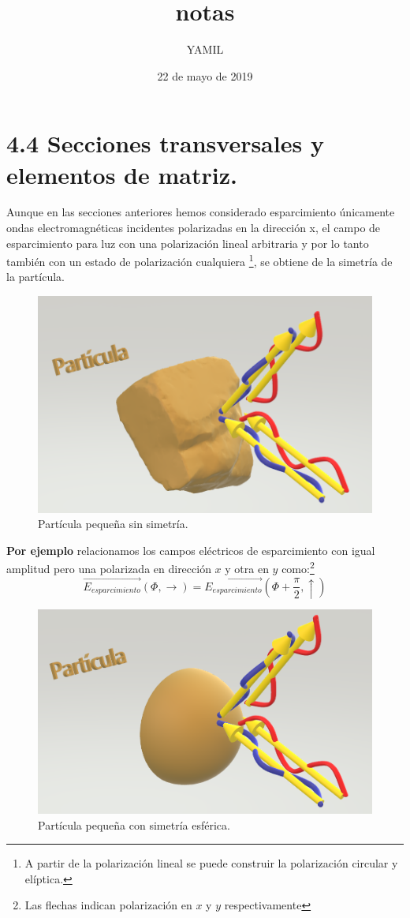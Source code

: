 \documentclass[letterpaper, 11pt]{article}
\title{notas} %
\author{YAMIL} %
\date{\small 22 de mayo de 2019}
\begin{document}
\maketitle %

\section*{4.4 Secciones transversales y elementos de matriz. }
Aunque en las secciones anteriores hemos considerado esparcimiento únicamente ondas electromagnéticas incidentes polarizadas en la dirección x, el campo de esparcimiento para luz con una polarización lineal arbitraria y por lo tanto también con un estado de polarización cualquiera \footnote{A partir de la polarización lineal se puede construir la polarización circular y elíptica.}, se obtiene de la simetría de la partícula.

\begin{figure}[hbt]
\centering
\includegraphics[width=.6\textwidth]{esparcidocualquiera.png}
\caption{Partícula pequeña sin simetría.}
\label{Fig 4.4}
\end{figure}

\textbf{Por ejemplo} relacionamos los campos eléctricos de esparcimiento con igual amplitud pero una polarizada en dirección $x$ y otra en $y$ como:\footnote{Las flechas indican polarización en $x$ y $y$ respectivamente}
\begin{equation}
    \vec{E_{esparcimiento}}(\Phi,\xrightarrow{})=\vec{E_{esparcimiento}}(\Phi+\frac{\pi}{2},\uparrow)
\end{equation}

\begin{figure}[hbt]
\centering
\includegraphics[width=.6\textwidth]{esparcidoesfera.png}
\caption{Partícula pequeña con simetría esférica.}
\label{Fig 4.4}
\end{figure}
\end{document}
